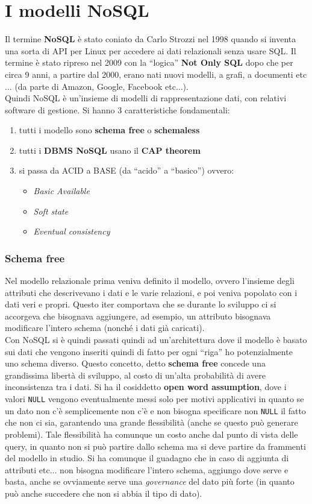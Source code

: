 \documentclass[a4paper,12pt, oneside]{book}
\begin{document}
\section{I modelli NoSQL}
Il termine \textbf{NoSQL} è stato coniato da Carlo Strozzi nel 1998 quando si
inventa una sorta di API per Linux per accedere ai dati relazionali senza usare
SQL. Il termine è stato ripreso nel 2009 con la ``logica'' \textbf{Not Only
  SQL} dopo che per circa 9 anni, a partire dal 2000, erano nati nuovi modelli,
a grafi, a documenti etc$\ldots$ (da parte di Amazon, Google, Facebook
etc$\ldots$).\\
Quindi NoSQL è un'insieme di modelli di rappresentazione dati, con relativi
software di gestione. Si hanno 3 caratteristiche fondamentali:
\begin{enumerate}
  \item tutti i modello sono \textbf{schema free} o \textbf{schemaless}
  \item tutti i \textbf{DBMS NoSQL} usano il \textbf{CAP theorem}
  \item si passa da ACID a BASE (da ``acido'' a ``basico'') ovvero:
  \begin{itemize}
    \item \textit{Basic Available}
    \item \textit{Soft state}
    \item \textit{Eventual consistency}
  \end{itemize}
\end{enumerate}
\subsubsection{Schema free}
Nel modello relazionale prima veniva definito il modello, ovvero l'insieme degli
attributi che descrivevano i dati e le varie relazioni, e poi veniva popolato
con i dati veri e propri. Questo iter comportava che se durante lo sviluppo ci
si accorgeva che bisognava aggiungere, ad esempio, un attributo bisognava
modificare l'intero schema (nonché i dati già caricati). \\
Con NoSQL si è quindi passati quindi ad un'architettura dove il modello è basato
sui dati che vengono inseriti quindi di fatto per ogni ``riga'' ho
potenzialmente uno schema diverso. Questo concetto, detto \textbf{schema free}
concede una grandissima libertà di sviluppo, al costo di un'alta probabilità di
avere inconsistenza tra i dati. Si ha il cosiddetto \textbf{open word
  assumption}, dove i valori \texttt{NULL} vengono eventualmente messi solo per
motivi applicativi in quanto se un dato non c'è semplicemente non c'è e non
bisogna specificare non \texttt{NULL} il fatto che non ci sia, garantendo una
grande flessibilità (anche se questo può generare problemi). Tale flessibilità
ha comunque un costo anche dal punto di vista delle query, in quanto non si può
partire dallo schema ma si deve partire da frammenti del modello in studio. Si
ha comunque il guadagno che in caso di aggiunta di attributi etc$\ldots$ non
bisogna modificare l'intero schema, aggiungo dove serve e basta, anche se
ovviamente serve una \textit{governance} del dato più forte (in quanto può anche
succedere che non si abbia il tipo di dato). 
\end{document}
